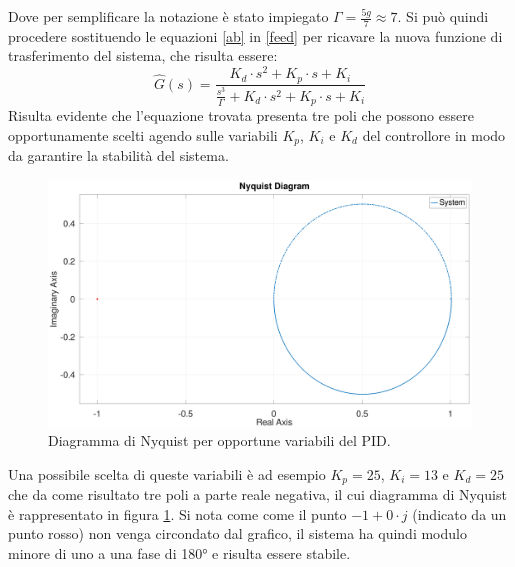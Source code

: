 \documentclass[12pt,twoside,openright]{report}
\begin{document}
Dove per semplificare la notazione è stato impiegato $\Gamma=\frac{5g}{7}\approx 7$. Si può quindi procedere sostituendo le equazioni \eqref{ab} in \eqref{feed} per ricavare la nuova funzione di trasferimento del sistema, che risulta essere:
\begin{equation}\label{transferaaaa}
\hat G(s)= \frac{K_d\cdot s^2+K_p\cdot s+ K_i}{\frac{s^3}{\Gamma}+K_d\cdot s^2+K_p\cdot s+ K_i}
\end{equation}
Risulta evidente che l'equazione trovata presenta tre poli che possono essere opportunamente scelti agendo sulle variabili $K_p$, $K_i$ e $K_d$ del controllore in modo da garantire la stabilità del sistema. 
\begin{figure}[h!]
\centering
\includegraphics[width=\textwidth]{nyquist.png}
\caption{Diagramma di Nyquist per opportune variabili del PID.} \label{fig:nyquist}
\end{figure}
Una possibile scelta di queste variabili è ad esempio $K_p=25$, $K_i=13$ e $K_d=25$ che da come risultato tre poli a parte reale negativa, il cui diagramma di Nyquist è rappresentato in figura \ref{fig:nyquist}.
Si nota come come il punto $-1+0\cdot j$ (indicato da un punto rosso) non venga circondato dal grafico, il sistema ha quindi modulo minore di uno a una fase di 180° e risulta essere stabile.
\end{document}
